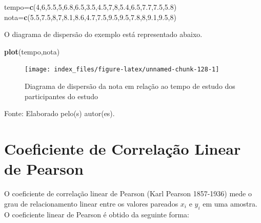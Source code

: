 \documentclass[12pt,brazil,oneside]{book}
\newenvironment{Shaded}{\begin{snugshade}}{\end{snugshade}}
\newcommand{\DecValTok}[1]{\textcolor[rgb]{0.00,0.00,0.81}{#1}}
\newcommand{\FloatTok}[1]{\textcolor[rgb]{0.00,0.00,0.81}{#1}}
\newcommand{\KeywordTok}[1]{\textcolor[rgb]{0.13,0.29,0.53}{\textbf{#1}}}
\newcommand{\NormalTok}[1]{#1}
\begin{document}
\begin{Shaded}
\begin{Highlighting}[]
\NormalTok{tempo=}\KeywordTok{c}\NormalTok{(}\DecValTok{4}\NormalTok{,}\DecValTok{6}\NormalTok{,}\FloatTok{5.5}\NormalTok{,}\DecValTok{5}\NormalTok{,}\FloatTok{6.8}\NormalTok{,}\FloatTok{6.5}\NormalTok{,}\FloatTok{3.5}\NormalTok{,}\FloatTok{4.5}\NormalTok{,}\DecValTok{7}\NormalTok{,}\DecValTok{8}\NormalTok{,}\FloatTok{5.4}\NormalTok{,}\FloatTok{6.5}\NormalTok{,}\FloatTok{7.7}\NormalTok{,}\FloatTok{7.5}\NormalTok{,}\FloatTok{5.8}\NormalTok{)}
\NormalTok{nota=}\KeywordTok{c}\NormalTok{(}\FloatTok{5.5}\NormalTok{,}\FloatTok{7.5}\NormalTok{,}\DecValTok{8}\NormalTok{,}\DecValTok{7}\NormalTok{,}\FloatTok{8.1}\NormalTok{,}\FloatTok{8.6}\NormalTok{,}\FloatTok{4.7}\NormalTok{,}\FloatTok{7.5}\NormalTok{,}\FloatTok{9.5}\NormalTok{,}\FloatTok{9.5}\NormalTok{,}\FloatTok{7.8}\NormalTok{,}\DecValTok{8}\NormalTok{,}\FloatTok{9.1}\NormalTok{,}\FloatTok{9.5}\NormalTok{,}\DecValTok{8}\NormalTok{)}
\end{Highlighting}
\end{Shaded}

O diagrama de dispersão do exemplo está representado abaixo.

\begin{Shaded}
\begin{Highlighting}[]
\KeywordTok{plot}\NormalTok{(tempo,nota)}
\end{Highlighting}
\end{Shaded}

\begin{figure}[H]

{\centering \texttt{[image: index\_files/figure-latex/unnamed-chunk-128-1]} 

}

\caption{Diagrama de dispersão da nota em relação ao tempo de estudo dos participantes do estudo}\label{fig:unnamed-chunk-128}
\end{figure}

Fonte: Elaborado pelo(s) autor(es).

\hypertarget{coeficiente-de-correlacao-linear-de-pearson}{%
\section{Coeficiente de Correlação Linear de
Pearson}\label{coeficiente-de-correlacao-linear-de-pearson}}

O coeficiente de correlação linear de Pearson (Karl Pearson 1857-1936)
mede o grau de relacionamento linear entre os valores pareados \(x_i\) e
\(y_i\) em uma amostra. O coeficiente linear de Pearson é obtido da
seguinte forma:
\end{document}
